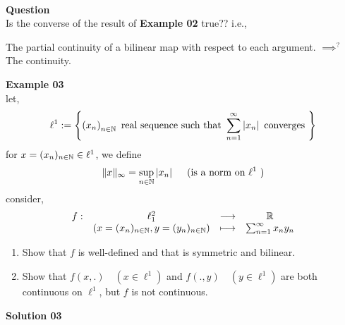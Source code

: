 \\
\textbf{Question}
\\
Is the converse of the result of \textbf{Example 02} true?? i.e.,
\begin{center}
	The partial continuity of a bilinear map with respect 
	to each argument. $ \implies ^{?} $  The continuity.
\end{center}
\textbf{Example 03}\\ 
let, 
\[
\ell ^{1} := 
\left\{ 
	\left( x_{n} \right)_{n \in \mathbb{N}} \text{ real sequence such that }  
	\sum_{n=1}^{\infty} \left| x_{n} \right|  \text{ converges } 
\right\}
\]
for $x = (x_{n})_{n \in \mathbb{N}} \in  \ell ^{1}  $, we define 
\[
\| x \| _{\infty } = 
\sup_{n \in \mathbb{N}}  \left| x_{n} \right| \quad 
\text{ (is a norm on $\ell ^{1	} $ )} 
\]
consider, 
\[
\begin{array}{cccc}
      f : &  \ell _{1}^{2}  & \longrightarrow &  \mathbb{R} \\

           &    (x=(x_{n})_{n \in \mathbb{N}}, y=(y_{n}) _{n \in \mathbb{N}} ) & \longmapsto     &  
	   \sum_{n=1}^{\infty} x_{n}y_{n}\\
\end{array}
\]
\begin{enumerate}[(1)]
\item Show that  $f $ is well-defined and that is symmetric
	and bilinear.
\item Show that $f(x,.) \quad ( x \in \ell ^{1})  $ and 
	$f(.,y) \quad (y \in  \ell ^{1})   $  are both continuous 
	on $\ell ^{1} $, but $f $ is not continuous.
\end{enumerate}
\textbf{Solution 03} \\
